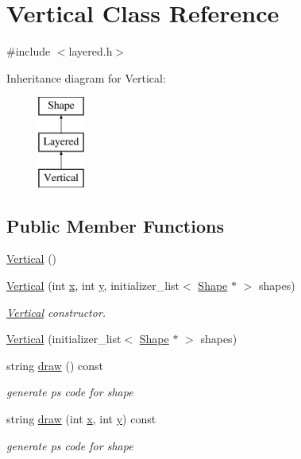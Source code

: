 \hypertarget{class_vertical}{}\section{Vertical Class Reference}
\label{class_vertical}


{\ttfamily \#include $<$layered.\+h$>$}

Inheritance diagram for Vertical\+:\begin{figure}[H]
\begin{center}
\leavevmode
\includegraphics[height=3.000000cm]{class_vertical}
\end{center}
\end{figure}
\subsection*{Public Member Functions}
\begin{DoxyCompactItemize}
\item 
\hyperlink{class_vertical_abe7fe115a8ff6300a0e60fab51f4da7e}{Vertical} ()
\item 
\hyperlink{class_vertical_a534fca34871e38a252b40acf94e05dbf}{Vertical} (int \hyperlink{class_shape_a41e403e73d2949f1a6adfba6032c41ec}{x}, int \hyperlink{class_shape_ac757f715cc5b5681f2c691663ac06f0a}{y}, initializer\+\_\+list$<$ \hyperlink{class_shape}{Shape} $\ast$ $>$ shapes)
\begin{DoxyCompactList}\small\item\em \hyperlink{class_vertical}{Vertical} constructor. \end{DoxyCompactList}\item 
\hyperlink{class_vertical_a3356dc6b2454dea361e08224b1bb187c}{Vertical} (initializer\+\_\+list$<$ \hyperlink{class_shape}{Shape} $\ast$ $>$ shapes)
\item 
string \hyperlink{class_vertical_a778fd2aa48afcf255b75413e29613ebb}{draw} () const 
\begin{DoxyCompactList}\small\item\em generate ps code for shape \end{DoxyCompactList}\item 
string \hyperlink{class_vertical_a9be329f986230ccaa35ec7f63553d658}{draw} (int \hyperlink{class_shape_a41e403e73d2949f1a6adfba6032c41ec}{x}, int \hyperlink{class_shape_ac757f715cc5b5681f2c691663ac06f0a}{y}) const 
\begin{DoxyCompactList}\small\item\em generate ps code for shape \end{DoxyCompactList}\end{DoxyCompactItemize}
